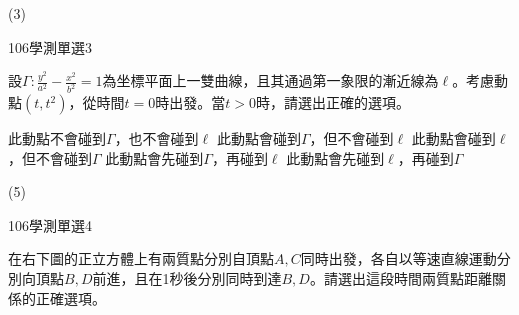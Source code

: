 \begin{QUESTIONS}
\begin{QUESTION}
\begin{QTAGS}
        \end{QTAGS}
        \begin{QANS}
            (3)
        \end{QANS}
        \begin{QSOL}
        \end{QSOL}
        \begin{QEMPTYSPACE}
        \end{QEMPTYSPACE}
    \end{QUESTION}
    \begin{QUESTION}
        \begin{ExamInfo}{106}{學測}{單選}{3}
        \end{ExamInfo}
        \begin{QBODY}
            設$\Gamma :\frac{{{y}^{2}}}{{{a}^{2}}}-\frac{{{x}^{2}}}{{{b}^{2}}}=1$為坐標平面上一雙曲線，且其通過第一象限的漸近線為$\ell $。考慮動點$(t,{{t}^{2}})$，從時間$t=0$時出發。當$t>0$時，請選出正確的選項。
        \begin{QOPS}
        \QOP 此動點不會碰到$\Gamma $，也不會碰到$\ell $
        \QOP 此動點會碰到$\Gamma $，但不會碰到$\ell $
        \QOP 此動點會碰到$\ell $，但不會碰到$\Gamma $
        \QOP 此動點會先碰到$\Gamma $，再碰到$\ell $
        \QOP 此動點會先碰到$\ell $，再碰到$\Gamma $
        \end{QOPS}
        \end{QBODY}
        \begin{QFROMS}
        \end{QFROMS}
        \begin{QTAGS}
        \end{QTAGS}
        \begin{QANS}
            (5)
        \end{QANS}
        \begin{QSOL}
        \end{QSOL}
        \begin{QEMPTYSPACE}
        \end{QEMPTYSPACE}
    \end{QUESTION}
    \begin{QUESTION}
        \begin{ExamInfo}{106}{學測}{單選}{4}
        \end{ExamInfo}
        \begin{QBODY}
            在右下圖的正立方體上有兩質點分別自頂點$A,C$同時出發，各自以等速直線運動分別向頂點$B,D$前進，且在1秒後分別同時到達$B,D$。請選出這段時間兩質點距離關係的正確選項。
        

\end{QBODY}
\end{QUESTION}
\end{QUESTIONS}
